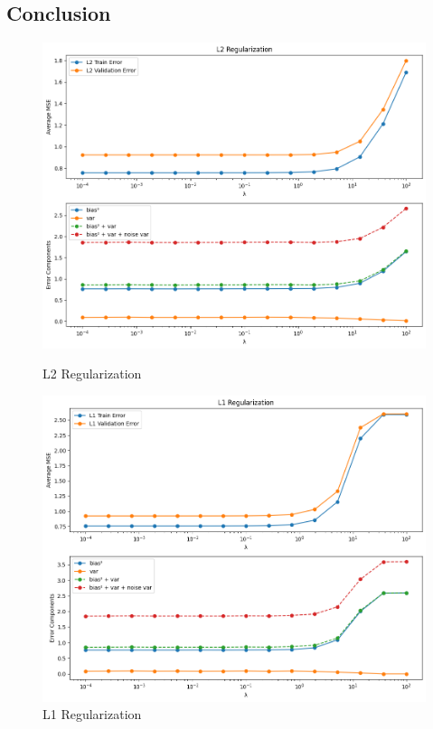 \documentclass{article}
\begin{document}
\subsection{Conclusion}
\begin{figure}[h]
    \centering
    \begin{minipage}{0.50\textwidth}
        \centering
        \includegraphics[width=\textwidth]{figures/L2_Regularization.png} 
        \caption{L2 Regularization}
        \label{data}
    \end{minipage}\hfill
    \begin{minipage}{0.50\textwidth}
        \centering
        \includegraphics[width=\textwidth]{figures/L1_Regularization.png} 
        \caption{L1 Regularization}
        \label{gaussian}
    \end{minipage}
\end{figure}
\end{document}
